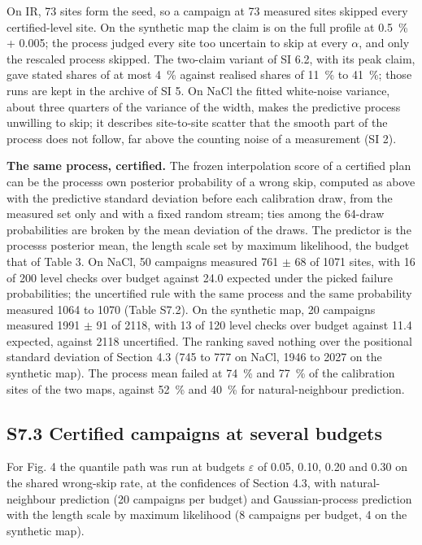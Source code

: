 \documentclass{iopjournal}
\begin{document}
On IR, 73 sites form the seed, so a campaign at 73 measured sites skipped every certified-level site. On the synthetic map the claim is on the full profile at 0.5~\% + 0.005; the process judged every site too uncertain to skip at every \ensuremath{\alpha}, and only the rescaled process skipped. The two-claim variant of SI 6.2, with its peak claim, gave stated shares of at most 4~\% against realised shares of 11~\% to 41~\%; those runs are kept in the archive of SI 5. On NaCl the fitted white-noise variance, about three quarters of the variance of the width, makes the predictive process unwilling to skip; it describes site-to-site scatter that the smooth part of the process does not follow, far above the counting noise of a measurement (SI 2).

\textbf{The same process, certified.} The frozen interpolation score of a certified plan can be the process\textquotesingle s own posterior probability of a wrong skip, computed as above with the predictive standard deviation before each calibration draw, from the measured set only and with a fixed random stream; ties among the 64-draw probabilities are broken by the mean deviation of the draws. The predictor is the process\textquotesingle s posterior mean, the length scale set by maximum likelihood, the budget that of Table 3. On NaCl, 50 campaigns measured 761 \ensuremath{\pm} 68 of 1071 sites, with 16 of 200 level checks over budget against 24.0 expected under the picked failure probabilities; the uncertified rule with the same process and the same probability measured 1064 to 1070 (Table S7.2). On the synthetic map, 20 campaigns measured 1991 \ensuremath{\pm} 91 of 2118, with 13 of 120 level checks over budget against 11.4 expected, against 2118 uncertified. The ranking saved nothing over the positional standard deviation of Section 4.3 (745 to 777 on NaCl, 1946 to 2027 on the synthetic map). The process mean failed at 74~\% and 77~\% of the calibration sites of the two maps, against 52~\% and 40~\% for natural-neighbour prediction.

\hypertarget{s7.3-certified-campaigns-at-several-budgets}{%
\subsection*{S7.3 Certified campaigns at several budgets}\label{s7.3-certified-campaigns-at-several-budgets}}

For Fig. 4 the quantile path was run at budgets \(\varepsilon\) of 0.05, 0.10, 0.20 and 0.30 on the shared wrong-skip rate, at the confidences of Section 4.3, with natural-neighbour prediction (20 campaigns per budget) and Gaussian-process prediction with the length scale by maximum likelihood (8 campaigns per budget, 4 on the synthetic map).
\end{document}
